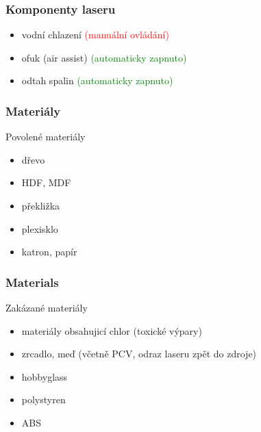 \documentclass[14pt]{beamer}
\begin{document}
\begin{frame}
\frametitle{Komponenty laseru}
\begin{itemize}
	
	\item vodní chlazení \textcolor{red}{(manuální ovládání)}
	\item ofuk (air assist) \textcolor{green}{(automaticky zapnuto)}
	\item odtah spalin \textcolor{green}{(automaticky zapnuto)}
	
\end{itemize}
\end{frame}








\begin{frame}
\frametitle{Materiály}


\begin{examples}{Povolené materiály}
	\begin{itemize}
		\item dřevo
		\item HDF, MDF
		\item překližka
		\item plexisklo
		\item katron, papír
	\end{itemize}
\end{examples}




\end{frame}

\begin{frame}
\frametitle{Materials}

\begin{alertblock}{Zakázané materiály}
	\begin{itemize}
		\item materiály obsahujicí chlor (toxické výpary)
		\item zrcadlo, meď (včetně PCV, odraz laseru zpět do zdroje)
		\item hobbyglass
		\item polystyren
		\item ABS
	\end{itemize}
\end{alertblock}

\end{frame}
\end{document}
